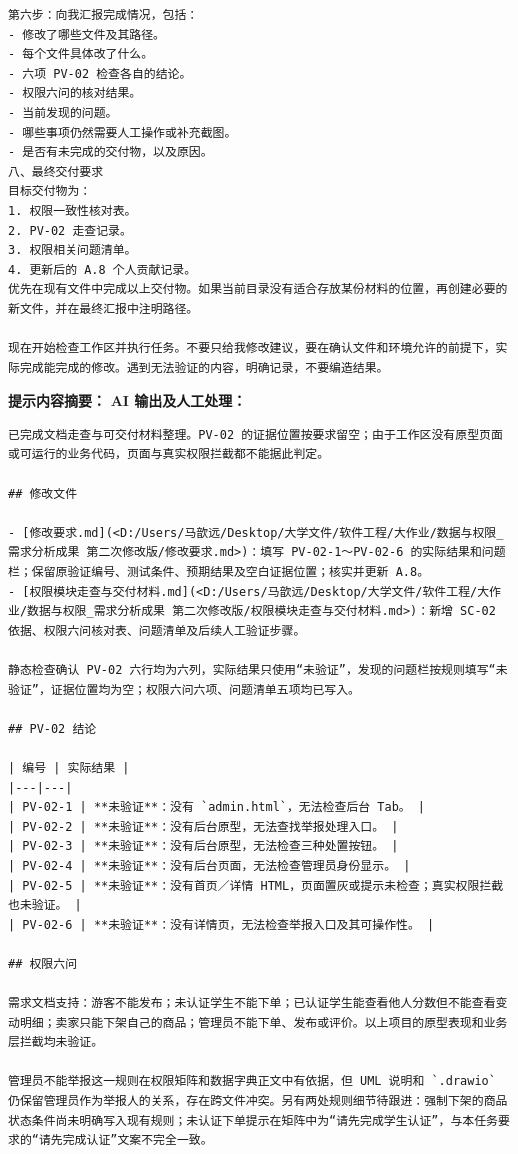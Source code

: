 \documentclass[heading=true,UTF8,a4paper,zihao=-4]{ctexart}
\begin{document}
\begin{QABox}
\begin{lstlisting}
第六步：向我汇报完成情况，包括：
- 修改了哪些文件及其路径。
- 每个文件具体改了什么。
- 六项 PV-02 检查各自的结论。
- 权限六问的核对结果。
- 当前发现的问题。
- 哪些事项仍然需要人工操作或补充截图。
- 是否有未完成的交付物，以及原因。
八、最终交付要求
目标交付物为：
1. 权限一致性核对表。
2. PV-02 走查记录。
3. 权限相关问题清单。
4. 更新后的 A.8 个人贡献记录。
优先在现有文件中完成以上交付物。如果当前目录没有适合存放某份材料的位置，再创建必要的新文件，并在最终汇报中注明路径。

现在开始检查工作区并执行任务。不要只给我修改建议，要在确认文件和环境允许的前提下，实际完成能完成的修改。遇到无法验证的内容，明确记录，不要编造结果。
\end{lstlisting}

\textbf{提示内容摘要：}
\textbf{AI 输出及人工处理：}
\begin{lstlisting}
已完成文档走查与可交付材料整理。PV-02 的证据位置按要求留空；由于工作区没有原型页面或可运行的业务代码，页面与真实权限拦截都不能据此判定。

## 修改文件

- [修改要求.md](<D:/Users/马歆远/Desktop/大学文件/软件工程/大作业/数据与权限_需求分析成果 第二次修改版/修改要求.md>)：填写 PV-02-1～PV-02-6 的实际结果和问题栏；保留原验证编号、测试条件、预期结果及空白证据位置；核实并更新 A.8。
- [权限模块走查与交付材料.md](<D:/Users/马歆远/Desktop/大学文件/软件工程/大作业/数据与权限_需求分析成果 第二次修改版/权限模块走查与交付材料.md>)：新增 SC-02 依据、权限六问核对表、问题清单及后续人工验证步骤。

静态检查确认 PV-02 六行均为六列，实际结果只使用“未验证”，发现的问题栏按规则填写“未验证”，证据位置均为空；权限六问六项、问题清单五项均已写入。

## PV-02 结论

| 编号 | 实际结果 |
|---|---|
| PV-02-1 | **未验证**：没有 `admin.html`，无法检查后台 Tab。 |
| PV-02-2 | **未验证**：没有后台原型，无法查找举报处理入口。 |
| PV-02-3 | **未验证**：没有后台原型，无法检查三种处置按钮。 |
| PV-02-4 | **未验证**：没有后台页面，无法检查管理员身份显示。 |
| PV-02-5 | **未验证**：没有首页／详情 HTML，页面置灰或提示未检查；真实权限拦截也未验证。 |
| PV-02-6 | **未验证**：没有详情页，无法检查举报入口及其可操作性。 |

## 权限六问

需求文档支持：游客不能发布；未认证学生不能下单；已认证学生能查看他人分数但不能查看变动明细；卖家只能下架自己的商品；管理员不能下单、发布或评价。以上项目的原型表现和业务层拦截均未验证。

管理员不能举报这一规则在权限矩阵和数据字典正文中有依据，但 UML 说明和 `.drawio` 仍保留管理员作为举报人的关系，存在跨文件冲突。另有两处规则细节待跟进：强制下架的商品状态条件尚未明确写入现有规则；未认证下单提示在矩阵中为“请先完成学生认证”，与本任务要求的“请先完成认证”文案不完全一致。


\end{lstlisting}
\end{QABox}
\end{document}
